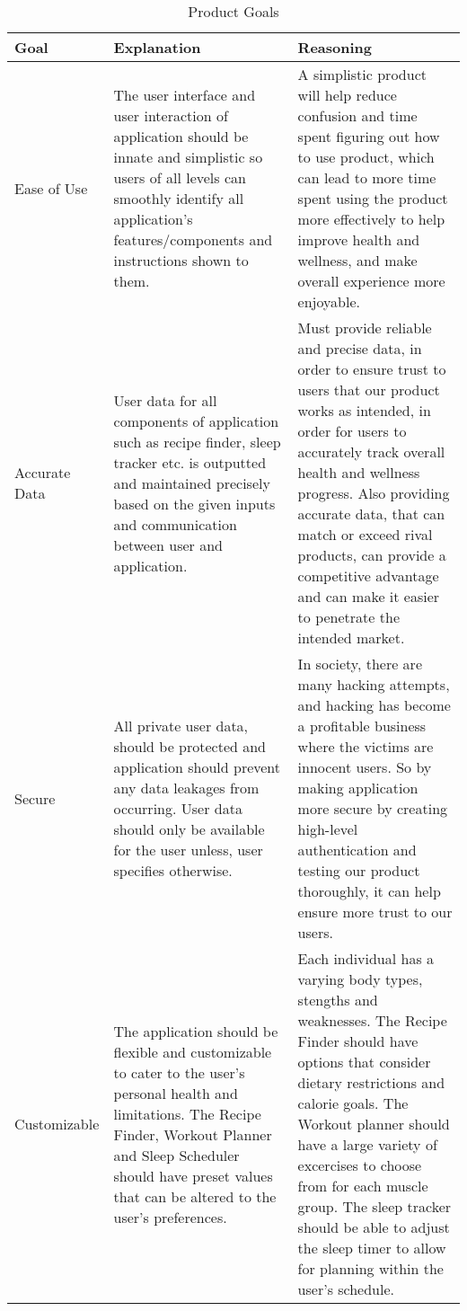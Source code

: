 \documentclass[12pt,letterpaper]{article}
\begin{document}
\begin{longtable}{ |p{3cm}|p{5cm}|p{5cm}| }
 \caption{Product Goals} \\ 
\toprule 
\textbf{Goal} &\textbf{ Explanation} & \textbf{Reasoning}\\
 \midrule
 Ease of Use & The user interface and user interaction of application should be innate and simplistic so users of all levels can smoothly identify all application's features/components and instructions shown to them.    & A simplistic product will help reduce confusion and time spent figuring out how to use product, which can lead to more time spent using the product more effectively to help improve health and wellness, and make overall experience more enjoyable.  \\
 \hline
 Accurate Data & User data for all components of application such as recipe finder, sleep tracker etc. is outputted and maintained precisely based on the given inputs and communication between user and application. & Must provide reliable and precise data, in order to ensure trust to users that our product works as intended, in order for users to accurately track overall health and wellness progress. Also providing accurate data, that can match or exceed rival products, can provide a competitive advantage and can make it easier to penetrate the intended market.\\
 \hline
 Secure & All private user data, should be protected and application should prevent any data leakages from occurring. User data should only be available for the user unless, user specifies otherwise.  & In society, there are many hacking attempts, and hacking has become a profitable business where the victims are innocent users. So by making application more secure by creating high-level authentication and testing our product thoroughly, it can help ensure more trust to our users. \\
 \hline
 Customizable & The application should be flexible and customizable to cater to the user's personal health and limitations. The Recipe Finder, Workout Planner and Sleep Scheduler should have preset values that can be altered to the user's preferences.  & Each individual has a varying body types, stengths and weaknesses. The Recipe Finder should have options that consider dietary restrictions and calorie goals. The Workout planner should have a large variety of excercises to choose from for each muscle group. The sleep tracker should be able to adjust the sleep timer to allow for planning within the user's schedule. \\

\end{longtable}
\end{document}
